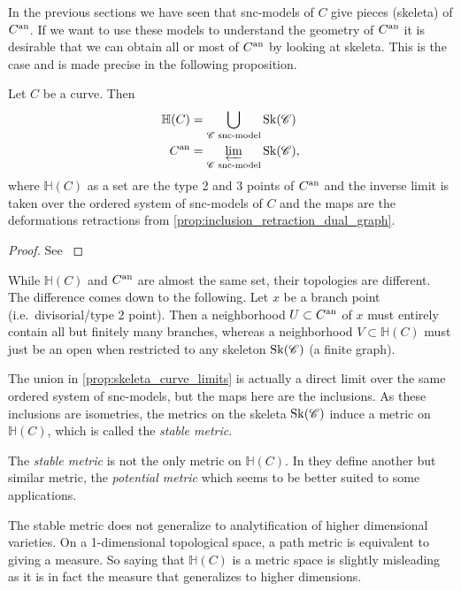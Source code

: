 In the previous sections we have seen that snc-models of $C$ give pieces (skeleta) of $C{}^{\text{an}}$. 
If we want to use these models to understand the geometry of $C{}^{\text{an}}$ it is desirable that we can obtain all or most of $C{}^{\text{an}}$ by looking at skeleta. 
This is the case and is made precise in the following proposition. 
\begin{proposition}\label{prop:skeleta_curve_limits}
	Let $C$ be a curve. Then 
	\begin{align*}
		\mathbb H(C) &= \bigcup_{\mathscr C \text{ snc-model}} \operatorname{Sk}(\mathscr C) \\
		C{}^{\text{an}} &= \varprojlim_{\mathscr C \text{ snc-model}} \operatorname{Sk}(\mathscr C)
	,\end{align*}
	where $\mathbb{H}(C)$ as a set are the type 2 and 3 points of $C{}^{\text{an}}$ and the inverse limit is taken over the ordered system of snc-models of $C$ and the maps are the deformations retractions from \cref{prop:inclusion_retraction_dual_graph}.
\end{proposition}
\begin{proof}
	See \cite[§2.2.2 and  lem.\ 2.3.2]{bakerWeightFunctionsBerkovich2016}
\end{proof}
\begin{remark}
	While $\mathbb{H}(C)$ and $C{}^{\text{an}}$ are almost the same set, their topologies are different. 
	The difference comes down to the following. 
	Let $x$ be a branch point (i.e.\ divisorial/type 2 point).
	Then a neighborhood $U \subset C{}^{\text{an}}$ of $x$ must entirely contain all but finitely many branches, whereas a neighborhood $V \subset \mathbb{H}(C)$ must just be an open when restricted to any skeleton $\operatorname{Sk}(\mathscr C)$ (a finite graph). 
\end{remark}

The union in \cref{prop:skeleta_curve_limits} is actually a direct limit over the same ordered system of snc-models, but the maps here are the inclusions. 
As these inclusions are isometries, the metrics on the skeleta $\operatorname{Sk}(\mathscr C)$ induce a metric on $\mathbb{H}(C)$, which is called the \emph{stable metric}. 

\begin{remark}
	The \emph{stable metric} is not the only metric on $\mathbb{H}(C)$. 
	In \cite{bakerWeightFunctionsBerkovich2016} they define another but similar metric, the \emph{potential metric} which seems to be better suited to some applications. 
\end{remark}

\begin{remark}
	The stable metric does not generalize to analytification of higher dimensional varieties. 
	On a 1-dimensional topological space, a path metric is equivalent to giving a measure. 
	So saying that $\mathbb{H}(C)$ is a metric space is slightly misleading as it is in fact the measure that generalizes to higher dimensions. 
\end{remark}

